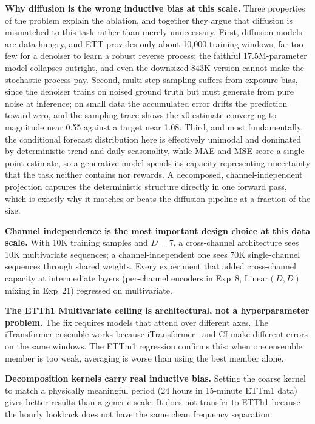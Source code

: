 \documentclass[conference]{IEEEtran}
\begin{document}
\textbf{Why diffusion is the wrong inductive bias at this scale.} Three properties of the problem explain the ablation, and together they argue that diffusion is mismatched to this task rather than merely unnecessary. First, diffusion models are data-hungry, and ETT provides only about 10{,}000 training windows, far too few for a denoiser to learn a robust reverse process: the faithful 17.5M-parameter model collapses outright, and even the downsized 843K version cannot make the stochastic process pay. Second, multi-step sampling suffers from exposure bias, since the denoiser trains on noised ground truth but must generate from pure noise at inference; on small data the accumulated error drifts the prediction toward zero, and the sampling trace shows the x0 estimate converging to magnitude near 0.55 against a target near 1.08. Third, and most fundamentally, the conditional forecast distribution here is effectively unimodal and dominated by deterministic trend and daily seasonality, while MAE and MSE score a single point estimate, so a generative model spends its capacity representing uncertainty that the task neither contains nor rewards. A decomposed, channel-independent projection captures the deterministic structure directly in one forward pass, which is exactly why it matches or beats the diffusion pipeline at a fraction of the size.

\textbf{Channel independence is the most important design choice at this data scale.} With 10K training samples and $D{=}7$, a cross-channel architecture sees 10K multivariate sequences; a channel-independent one sees 70K single-channel sequences through shared weights. Every experiment that added cross-channel capacity at intermediate layers (per-channel encoders in Exp~8, $\mathrm{Linear}(D,D)$ mixing in Exp~21) regressed on multivariate.

\textbf{The ETTh1 Multivariate ceiling is architectural, not a hyperparameter problem.} The fix requires models that attend over different axes. The iTransformer ensemble works because iTransformer~\cite{itransformer} and CI make different errors on the same windows. The ETTm1 regression confirms this: when one ensemble member is too weak, averaging is worse than using the best member alone.

\textbf{Decomposition kernels carry real inductive bias.} Setting the coarse kernel to match a physically meaningful period (24 hours in 15-minute ETTm1 data) gives better results than a generic scale. It does not transfer to ETTh1 because the hourly lookback does not have the same clean frequency separation.
\end{document}
